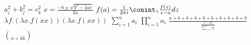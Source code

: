 $a_i^2 + b^2_j = c_k^2$
$x=\frac{-b \pm \sqrt{b^2 - 4ac}}{2a}$
$f(a) = \frac{1}{2 \pi i} \conint_{\gamma}\frac{f(z)}{z-a}dz$
$\lambda f . (\lambda x . f (x x))(\lambda x . f (x x))$
$\sum_{i=1}^n a_i$
$\prod_{i=1}^n a_i$
$\frac{a+b+b+b+b+b+b+b+b+b}{\frac{c-d}{\sum_{i=1}^n q_i}}$
$\choose{n+k}{k}$
